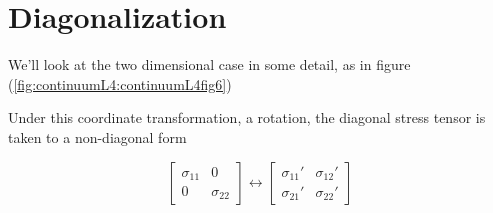\section{Diagonalization}

We'll look at the two dimensional case in some detail, as in figure (\ref{fig:continuumL4:continuumL4fig6})


Under this coordinate transformation, a rotation, the diagonal stress tensor is taken to a non-diagonal form

\begin{equation}\label{eqn:continuumL4:130}
\begin{bmatrix}
\sigma_{11} & 0 \\
0 & \sigma_{22} 
\end{bmatrix}
\leftrightarrow
\begin{bmatrix}
\sigma_{11}' & \sigma_{12}' \\
\sigma_{21}' & \sigma_{22}' 
\end{bmatrix}
\end{equation}
